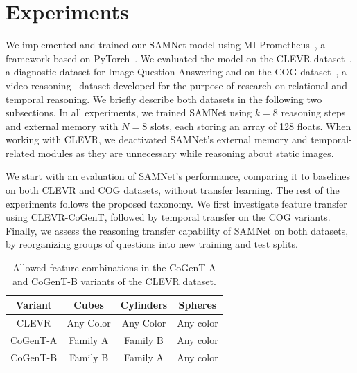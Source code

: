 \section{Experiments}
\label{sec:experiments}

We implemented and trained our SAMNet model using MI-Prometheus~\cite{kornuta2018accelerating}, a framework based on PyTorch~\cite{paszke2017automatic}.
We evaluated the model on
the CLEVR dataset~\cite{johnson2017clevr}, a diagnostic dataset for Image Question Answering and on the COG dataset~\cite{yang2018dataset}, a video reasoning~\cite{mogadala2019trends} dataset developed for the purpose of research on relational and temporal reasoning.
We briefly describe both datasets in the following two subsections.
In all experiments, we trained SAMNet using $k = 8$ reasoning steps and external memory with $N = 8$ slots, each storing an array of 128 floats.
When working with CLEVR, we deactivated SAMNet's external memory and temporal-related modules as they are unnecessary while reasoning about static images.

We start with an evaluation of SAMNet's performance, comparing it to baselines on both CLEVR and COG datasets, without transfer learning.
The rest of the experiments follows the proposed taxonomy.
We first investigate feature transfer using CLEVR-CoGenT, followed by temporal transfer on the COG variants. Finally, we assess the reasoning transfer capability of SAMNet on both datasets, by reorganizing groups of questions into new training and test splits.

\begin{table}[b!]
	\centering
	\begin{tabular}{cccc}
		\toprule
		Variant	& Cubes	& Cylinders &	Spheres	\\
		\midrule
		CLEVR &  Any Color  & Any Color 	&	Any color  \\
		CoGenT-A &  Family A  & Family B 	&	Any color  \\
		CoGenT-B	&	Family B  &	Family A	&	Any color \\
		\bottomrule
	\end{tabular}
	\caption{Allowed feature combinations in the CoGenT-A and CoGenT-B variants of the CLEVR dataset.}%
	\label{tab:cogent_conditions}
\end{table}

